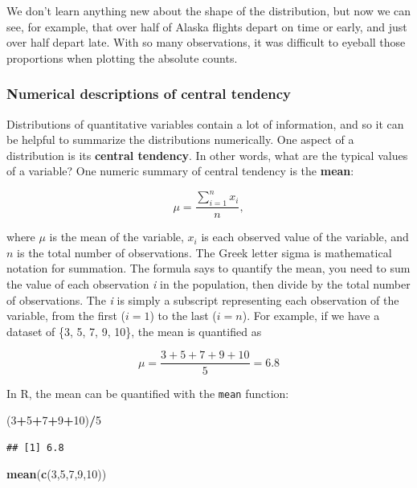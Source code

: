 \documentclass[
]{book}
\newenvironment{Shaded}{\begin{snugshade}}{\end{snugshade}}
\newcommand{\DecValTok}[1]{\textcolor[rgb]{0.00,0.00,0.81}{#1}}
\newcommand{\FunctionTok}[1]{\textcolor[rgb]{0.13,0.29,0.53}{\textbf{#1}}}
\newcommand{\NormalTok}[1]{#1}
\newcommand{\SpecialCharTok}[1]{\textcolor[rgb]{0.81,0.36,0.00}{\textbf{#1}}}
\begin{document}
We don't learn anything new about the shape of the distribution, but now we can see, for example, that over half of Alaska flights depart on time or early, and just over half depart late. With so many observations, it was difficult to eyeball those proportions when plotting the absolute counts.

\subsubsection{Numerical descriptions of central tendency}\label{numerical-descriptions-of-central-tendency}

Distributions of quantitative variables contain a lot of information, and so it can be helpful to summarize the distributions numerically. One aspect of a distribution is its \textbf{central tendency}. In other words, what are the typical values of a variable? One numeric summary of central tendency is the \textbf{mean}:

\[
\mu = \frac{\sum_{i=1}^n x_i}{n},
\]

where \(\mu\) is the mean of the variable, \(x_i\) is each observed value of the variable, and \(n\) is the total number of observations. The Greek letter sigma is mathematical notation for summation. The formula says to quantify the mean, you need to sum the value of each observation \emph{i} in the population, then divide by the total number of observations. The \emph{i} is simply a subscript representing each observation of the variable, from the first (\(i = 1\)) to the last (\(i = n\)). For example, if we have a dataset of \{3, 5, 7, 9, 10\}, the mean is quantified as

\[
\mu = \frac{3+5+7+9+10}{5}=6.8
\]

In R, the mean can be quantified with the \texttt{mean} function:

\begin{Shaded}
\begin{Highlighting}[]
\NormalTok{(}\DecValTok{3}\SpecialCharTok{+}\DecValTok{5}\SpecialCharTok{+}\DecValTok{7}\SpecialCharTok{+}\DecValTok{9}\SpecialCharTok{+}\DecValTok{10}\NormalTok{)}\SpecialCharTok{/}\DecValTok{5}
\end{Highlighting}
\end{Shaded}

\begin{verbatim}
## [1] 6.8
\end{verbatim}

\begin{Shaded}
\begin{Highlighting}[]
\FunctionTok{mean}\NormalTok{(}\FunctionTok{c}\NormalTok{(}\DecValTok{3}\NormalTok{,}\DecValTok{5}\NormalTok{,}\DecValTok{7}\NormalTok{,}\DecValTok{9}\NormalTok{,}\DecValTok{10}\NormalTok{))}
\end{Highlighting}
\end{Shaded}
\end{document}
